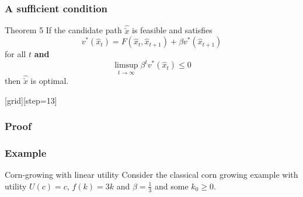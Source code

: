 \documentclass[aspectratio=169]{beamer}
\begin{document}
\begin{frame}
\frametitle{A sufficient condition}
\begin{block}{Theorem 5}
If the candidate path $\hat{\utilde{x}}$ is feasible and satisfies 
\begin{equation*}
v^{*}(\hat{x}_{t}) = F(\hat{x}_{t}, \hat{x}_{t+1}) + \beta v^{*}(\hat{x}_{t+1})
\end{equation*}
for all $t$ \textbf{and}
\begin{equation*}
\limsup_{t \to \infty} \beta^{t}v^{*}(\hat{x}_{t}) \leq 0 
\end{equation*}
then $\hat{\utilde{x}}$ is optimal.
\end{block}
\end{frame}

{
[grid][step=13]

\begin{frame}
\frametitle{Proof}
\end{frame}

\begin{frame}[t]
\frametitle{Example}
\begin{block}{Corn-growing with linear utility}
Consider the classical corn growing example with utility $U(c)=c$, $f(k)=3k$ and $\beta= \frac{1}{3}$ and some $k_0 \geq 0$.
\end{block}
\end{frame}

}
\end{document}
